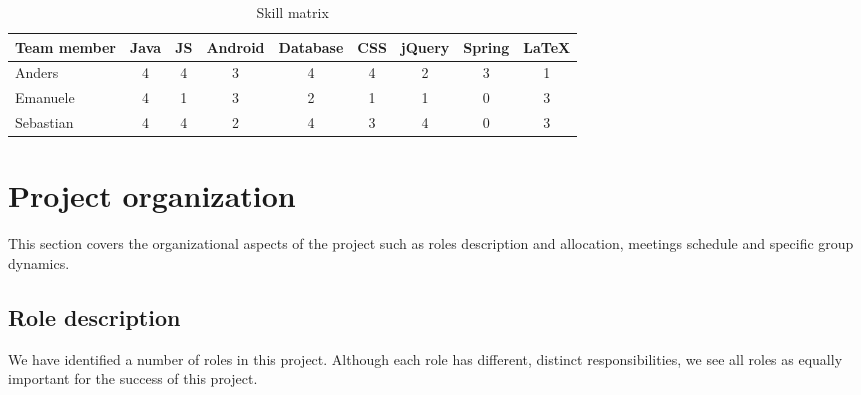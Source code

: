 \begin{table}[h]
\begin{center}
\begin{tabular}{ | l | c | c | c | c | c | c | c | c | }
  \hline
  Team member & Java & JS & Android & Database & CSS & jQuery & Spring & LaTeX \\
  \hline\noalign{\smallskip}\hline
  Anders & 4 & 4 & 3 & 4 & 4 & 2 & 3 & 1 \\
  Emanuele & 4 & 1 & 3 & 2 & 1 & 1 & 0 & 3 \\
  Sebastian & 4 & 4 & 2 & 4 & 3 & 4 & 0 & 3 \\
  \hline
\end{tabular}
\end{center}
\caption{Skill matrix}
\label{table:skillmatrix}
\end{table}

\newpage
\section{Project organization}
\label{section:organization}

This section covers the organizational aspects of the project such as roles description and allocation,
meetings schedule and specific group dynamics.

\subsection{Role description}
We have identified a number of roles in this project. Although each role has different, distinct responsibilities,
we see all roles as equally important for the success of this project.

